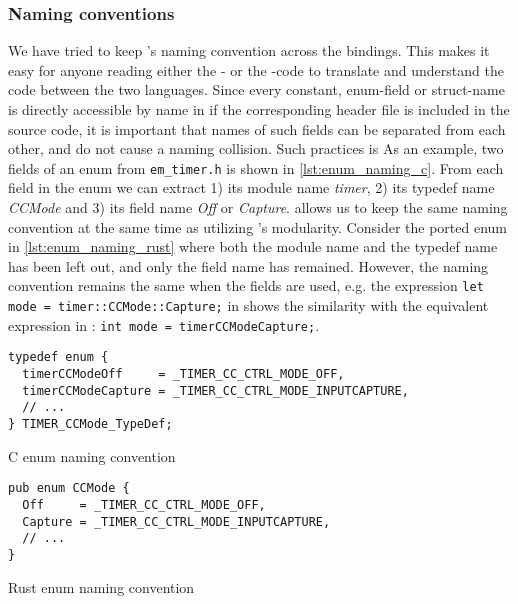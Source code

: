 
\subsubsection{Naming conventions}

We have tried to keep \emlib's naming convention across the bindings. This makes it easy for anyone
reading either the \C- or the \rust-code to translate and understand the code between the two
languages. Since every constant, enum-field or struct-name is directly accessible by name in \C if
the corresponding header file is included in the source code, it is important that names of such
fields can be separated from each other, and do not cause a naming collision. Such practices is  As an example, two
fields of an enum from \texttt{em\_timer.h} is shown in \autoref{lst:enum_naming_c}. From each field in
the enum we can extract 1) its module name \textit{timer}, 2) its typedef name \textit{CCMode} and
3) its field name \textit{Off} or \textit{Capture}. \rust allows us to keep the same naming
convention at the same time as utilizing \rust's modularity. Consider the ported enum in
\autoref{lst:enum_naming_rust} where both the module name and the typedef name has been left out,
and only the field name has remained. However, the naming convention remains the same when the
fields are used, e.g. the expression \texttt{let mode = timer::CCMode::Capture;} in \rust shows the
similarity with the equivalent expression in \C: \texttt{int mode = timerCCModeCapture;}.



\begin{listing}[tb]
\begin{verbatim}
typedef enum {
  timerCCModeOff     = _TIMER_CC_CTRL_MODE_OFF,
  timerCCModeCapture = _TIMER_CC_CTRL_MODE_INPUTCAPTURE,
  // ...
} TIMER_CCMode_TypeDef;
\end{verbatim}
\caption{C enum naming convention}
\label{lst:enum_naming_c}
\end{listing}

\begin{listing}[tb]
\begin{verbatim}
pub enum CCMode {
  Off     = _TIMER_CC_CTRL_MODE_OFF,
  Capture = _TIMER_CC_CTRL_MODE_INPUTCAPTURE,
  // ...
}
\end{verbatim}
\caption{Rust enum naming convention}
\label{lst:enum_naming_rust}
\end{listing}


